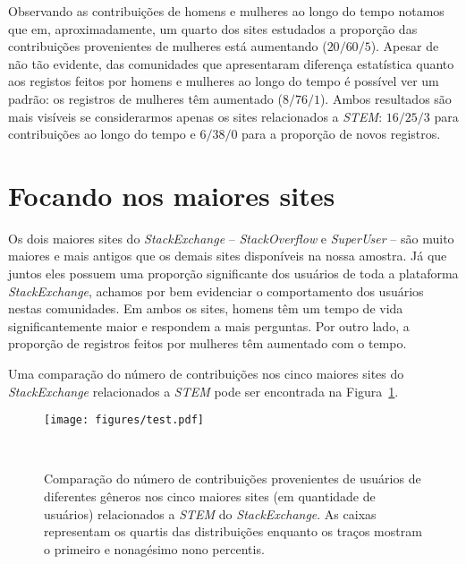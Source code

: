 Observando as contribuições de homens e mulheres ao longo do tempo notamos que em, aproximadamente, um quarto dos sites estudados a proporção das contribuições provenientes de mulheres está aumentando ($20/60/5$). Apesar de não tão evidente, das comunidades que apresentaram diferença estatística quanto aos registos feitos por homens e mulheres ao longo do tempo é possível ver um padrão: os registros de mulheres têm aumentado ($8/76/1$). Ambos resultados são mais visíveis se considerarmos apenas os sites relacionados a \emph{STEM}: $16/25/3$ para contribuições ao longo do tempo e $6/38/0$ para a proporção de novos registros.

\section{Focando nos maiores sites} %

Os dois maiores sites do \emph{StackExchange} -- \emph{StackOverflow} e \emph{SuperUser} -- são muito maiores e mais antigos que os demais sites disponíveis na nossa amostra. Já que juntos eles possuem uma proporção significante dos usuários de toda a plataforma \emph{StackExchange}, achamos por bem evidenciar o comportamento dos usuários nestas comunidades. Em ambos os sites, homens têm um tempo de vida significantemente maior e respondem a mais perguntas. Por outro lado, a proporção de registros feitos por mulheres têm aumentado com o tempo.

Uma comparação do número de contribuições nos cinco maiores sites do \emph{StackExchange} relacionados a \emph{STEM} pode ser encontrada na Figura~\ref{figure:top-five}.


\begin{figure}
  \centering
  \texttt{[image: figures/test.pdf]}
  \caption[Comparação do número de contribuições na 5 maiores comunidades.]{Comparação do número de contribuições provenientes de usuários de diferentes gêneros nos cinco maiores sites (em quantidade de usuários) relacionados a \emph{STEM} do \emph{StackExchange}. As caixas representam os quartis das distribuições enquanto os traços mostram o primeiro e nonagésimo nono percentis.}~\label{figure:top-five}
\end{figure}




